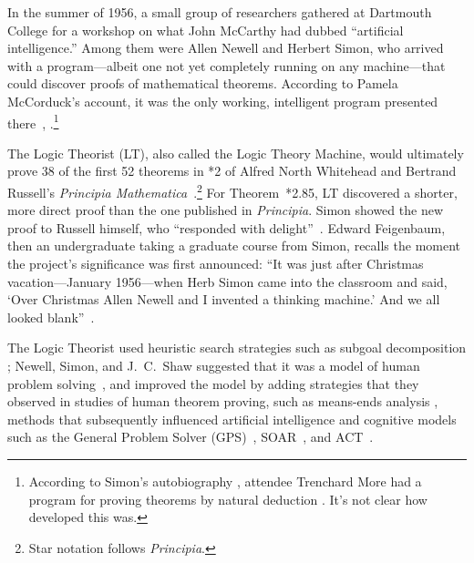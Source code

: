 \documentclass{IEEEcsmag}
\begin{document}
In the summer of 1956, a small group of researchers gathered at
Dartmouth College for a workshop on what John McCarthy had dubbed
``artificial intelligence.'' Among them were Allen Newell and Herbert
Simon, who arrived with a program---albeit one not yet completely running on any 
machine---that could discover proofs of mathematical theorems.
According to Pamela McCorduck's account, it was the only working,
intelligent program presented there~\cite[Ch.~13]{simon1996models},
\cite[p.~123]{mccorduck2004machines}.\footnote{According to
Simon's autobiography \cite[Ch.~13]{simon1996models},
attendee Trenchard More had a program for proving theorems
by natural deduction \cite{more1956,more1957,simon1999}.
It's not clear how developed this was.
}

The Logic Theorist (LT), also called the Logic Theory Machine, would 
ultimately prove 38 of the first 52 theorems in *2 of Alfred North Whitehead 
and Bertrand Russell's \textit{Principia Mathematica}~\cite{LT1957,whitehead1910principia}.\footnote{Star notation follows \textit{Principia}.}  
For Theorem~*2.85, LT discovered a shorter, more direct proof
than the one published in \textit{Principia}. Simon showed the new
proof to Russell himself, who ``responded with
delight''~\cite[p.~167]{mccorduck2004machines}. Edward Feigenbaum,
then an undergraduate taking a graduate course from Simon, recalls the
moment the project's significance was first announced: ``It was just after Christmas vacation---January
1956---when Herb Simon came into the classroom and said, `Over
Christmas Allen Newell and I invented a thinking machine.' And we all
looked blank''~\cite[p.~138]{mccorduck2004machines}.

The Logic Theorist
used heuristic search strategies such as subgoal decomposition
\cite{LT1957}; Newell, Simon, and J.~C.~Shaw suggested that it was a model of
human problem solving~\cite{HPS1958}, and improved the model by adding strategies
that they observed in studies of human theorem proving, such as means-ends analysis \cite{PCT1959}, methods that subsequently influenced artificial intelligence and cognitive models such as the General Problem Solver
(GPS)~\cite{newell1959gps}, SOAR~\cite{laird1991},
and ACT~\cite{anderson1993,anderson1996}.
\end{document}
